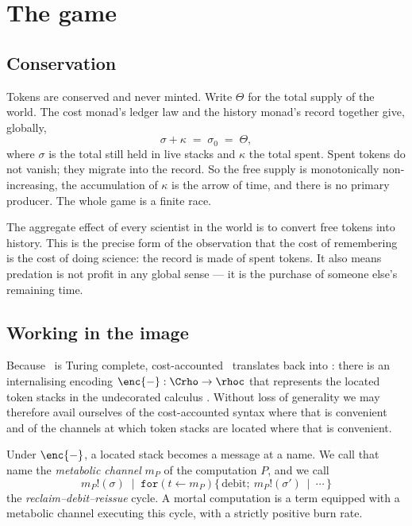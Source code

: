 \section{The game}\label{sci:S7}
\label{sci:sec:game}

\subsection{Conservation}\label{sci:S7.1}

Tokens are conserved and never minted. Write $\Theta$ for the total supply of the world. The cost
monad's ledger law and the history monad's record together give, globally,
\[
\sigma + \kappa \;=\; \sigma_0 \;=\; \Theta ,
\]
where $\sigma$ is the total still held in live stacks and $\kappa$ the total spent. Spent tokens do
not vanish; they migrate into the record. So the free supply is monotonically non-increasing, the
accumulation of $\kappa$ is the arrow of time, and there is no primary producer. The whole game is a
finite race.

\begin{remark}\label{sci:science-entropy-production}
The aggregate effect of every scientist in the world is to convert free tokens into history. This is
the precise form of the observation that the cost of remembering is the cost of doing science: the
record is made of spent tokens. It also means predation is not profit in any global sense --- it is
the purchase of someone else's remaining time.
\end{remark}

\subsection{Working in the image}\label{sci:S7.2}
\label{sci:sec:image}

Because \rhoc\ is Turing complete, cost-accounted \rhoc\ translates back into \rhoc: there is an
internalising encoding $\enc{-} : \Crho \to \rhoc$ that represents the located token stacks in the
undecorated calculus \cite[\S6]{Omnibus}. Without loss of generality we may therefore avail ourselves
of the cost-accounted syntax where that is convenient and of the channels at which token stacks are
located where that is convenient.

\begin{definition}
\label{sci:def:metabolic}
Under $\enc{-}$, a located stack becomes a message at a name. We call that name the \emph{metabolic
channel} $m_P$ of the computation $P$, and we call
\[
m_P!(\sigma) \;\mid\; \texttt{for}(t \leftarrow m_P)\{\, \text{debit};\ m_P!(\sigma')\ \mid\ \cdots \,\}
\]
the \emph{reclaim--debit--reissue} cycle. A mortal computation is a term equipped with a metabolic
channel executing this cycle, with a strictly positive burn rate.
\end{definition}

